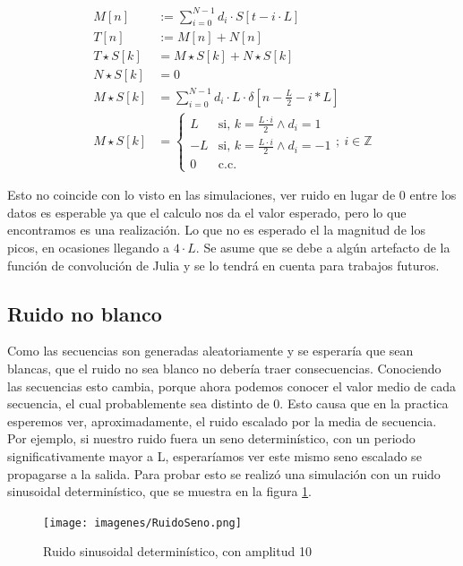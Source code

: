 \documentclass[12pt,letterpaper]{article}     %
\begin{document}
\begin{equation}
	\begin{split}
		M[n] &:= 
		\sum_{
			i=0
		}^{
			N-1
		}
		d_i\cdot S[t-i\cdot L]\\
		T[n] &:= M[n] + N[n]\\
		T\star S[k] &= M\star S[k] + N\star S[k]\\
		N\star S[k] &= 0\\
		M\star S[k] &= \sum_{
			i=0
		}^{
			N-1
		}
		d_i\cdot L\cdot\delta[n-\frac{L}{2}-i*L]\\
		M\star S[k] &= 
		\begin{cases}
			L & \text{si, }k=\frac{L\cdot i}{2}\wedge d_i=1\\
			-L & \text{si, }k=\frac{L\cdot i}{2}\wedge d_i=-1\\
			0 & \text{c.c.}
		\end{cases}
		;\ i\in\mathbb{Z}
	\end{split}
\end{equation}

Esto no coincide con lo visto en las simulaciones, ver ruido en lugar de 0 entre los datos es esperable
ya que el calculo nos da el valor esperado, pero lo que encontramos es una realización. Lo que no es
esperado el la magnitud de los picos, en ocasiones llegando a $4\cdot L$. Se asume que se debe a algún
artefacto de la función de convolución de Julia y se lo tendrá en cuenta para trabajos futuros.

\subsection{Ruido no blanco}

Como las secuencias son generadas aleatoriamente y se esperaría que sean blancas, que el 
ruido no sea blanco no debería traer consecuencias. 
Conociendo las secuencias esto cambia, porque ahora podemos conocer el valor medio de cada secuencia,
el cual probablemente sea distinto de 0. Esto causa que en la practica esperemos ver, aproximadamente,
el ruido escalado por la media de secuencia. Por ejemplo, si nuestro ruido fuera un seno determinístico,
con un periodo significativamente mayor a L, esperaríamos ver este mismo seno escalado se propagarse a la
salida. Para probar esto se realizó una simulación con un ruido sinusoidal determinístico, que se muestra
en la figura \ref{fig:seno}.

\begin{figure}[!ht]
\centering
\texttt{[image: imagenes/RuidoSeno.png]}
\caption{Ruido sinusoidal determinístico, con amplitud 10}
\label{fig:seno}
\end{figure}
\end{document}
